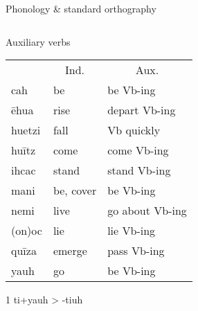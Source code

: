 \documentclass[12pt]{beamer}
\newcommand{\nah}[1]{\textcolor{nahgrn}{#1}}
\newcommand{\trs}[1]{\textcolor{nahblu}{#1}}
\begin{document}
\begin{frame}
\begin{columns}[t]
\begin{column}{.22\linewidth}
\begin{block}{Phonology \& standard orthography}
\begin{threeparttable}
\begin{tablenotes}
\begin{frame}
\begin{frame}
\begin{columns}[t]
\begin{column}{.18\linewidth}
\begin{block}{Auxiliary verbs}
\begin{threeparttable}
\begin{tabular}{lll}
                                                    & \multicolumn{1}{c}{Ind.} & \multicolumn{1}{c}{Aux.} \\ 
                            \nah{cah}    & \trs{be}                  & \trs{be Vb-ing}         \\
                            \nah{ēhua}   & \trs{rise}        & \trs{depart   Vb-ing}   \\
                            \nah{huetzi} & \trs{fall}                & \trs{Vb   quickly}      \\
                            \nah{huītz}  & \trs{come}                & \trs{come   Vb-ing}     \\
                            \nah{ihcac}  & \trs{stand}               & \trs{stand   Vb-ing}    \\
                            \nah{mani}   & \trs{be, cover}     & \trs{be Vb-ing}         \\
                            \nah{nemi}   & \trs{live}                & \trs{go   about Vb-ing} \\
                            \nah{(on)oc} & \trs{lie}                 & \trs{lie   Vb-ing}      \\
                            \nah{quīza}  & \trs{emerge}        & \trs{pass   Vb-ing}     \\
                            \nah{yauh}\tnote{1}   & \trs{go}                  & \trs{be Vb-ing}         \\ 
                          \end{tabular}
                          \begin{tablenotes}
                          \item[1] \nah{ti+yauh} > \nah{-tiuh}
                          \end{tablenotes}
                        \end{threeparttable}
                        

\end{block}
\end{column}
\end{columns}
\end{frame}
\end{frame}
\end{tablenotes}
\end{threeparttable}
\end{block}
\end{column}
\end{columns}
\end{frame}
\end{document}
